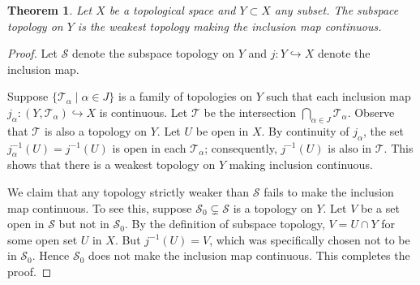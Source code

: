 \documentclass[12pt]{article}
\newtheorem*{theorem*}{Theorem}
\begin{document}
\begin{theorem*}
Let $X$ be a topological space and $Y\subset X$ any subset.  The subspace topology on $Y$ is the weakest topology making the inclusion map continuous.
\end{theorem*}

\begin{proof}
Let $\mathcal{S}$ denote the subspace topology on $Y$ and $j\colon Y\hookrightarrow X$ denote the inclusion map.

Suppose $\{\mathcal{T}_{\alpha}\mid\alpha\in J\}$ is a family of topologies on $Y$ such that each inclusion map $j_{\alpha}\colon(Y,\mathcal{T}_{\alpha})\hookrightarrow X$ is continuous.  Let $\mathcal{T}$ be the intersection $\bigcap_{\alpha\in J}\mathcal{T}_{\alpha}$.  Observe that $\mathcal{T}$ is also a topology on $Y$.  Let $U$ be open in $X$.  By continuity of $j_{\alpha}$, the set $j_{\alpha}^{-1}(U)=j^{-1}(U)$ is open in each $\mathcal{T}_{\alpha}$; consequently, $j^{-1}(U)$ is also in $\mathcal{T}$.   This shows that there is a weakest topology on $Y$ making inclusion continuous.

We claim that any topology strictly weaker than $\mathcal{S}$ fails to make the inclusion map continuous.  To see this, suppose $\mathcal{S}_0\subsetneq\mathcal{S}$ is a topology on $Y$.  Let $V$ be a set open in $\mathcal{S}$ but not in $\mathcal{S}_0$.  By the definition of subspace topology, $V=U\cap Y$ for some open set $U$ in $X$.  But $j^{-1}(U)=V$, which was specifically chosen not to be in $\mathcal{S_0}$.  Hence $\mathcal{S_0}$ does not make the inclusion map continuous.  This completes the proof.
\end{proof}
\end{document}
